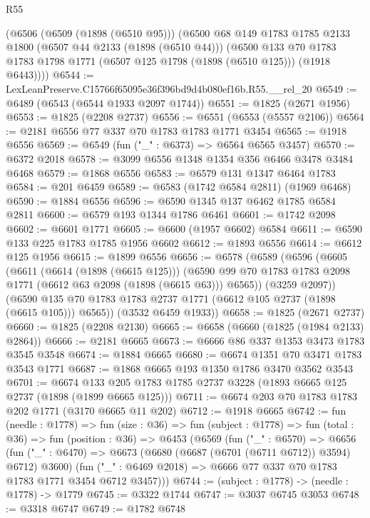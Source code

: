 \begin{lexlean}{R55}
\begin{coremodule}
    (@6506
      (@6509 (@1898 (@6510 @95)))
      (@6500
        @68
        @149
        @1783
        @1785
        @2133
        @1800
        (@6507 @44 @2133 (@1898 (@6510 @44)))
        (@6500
          @133
          @70
          @1783
          @1783
          @1798
          @1771
          (@6507 @125 @1798 (@1898 (@6510 @125)))
          (@1918 @6443))))
@6544 := LexLeanPreserve.C15766f65095e36f396bd9d4b080ef16b.R55.__rel_20
@6549 := @6489 (@6543 (@6544 @1933 @2097 @1744))
@6551 := @1825 (@2671 @1956)
@6553 := @1825 (@2208 @2737)
@6556 := @6551 (@6553 (@5557 @2106))
@6564 := @2181 @6556 @77 @337 @70 @1783 @1783 @1771 @3454
@6565 := @1918 @6556
@6569 := @6549 (fun ("_" : @6373) => @6564 @6565 @3457)
@6570 := @6372 @2018
@6578 := @3099 @6556 @1348 @1354 @356 @6466 @3478 @3484 @6468
@6579 := @1868 @6556
@6583 := @6579 @131 @1347 @6464 @1783
@6584 := @201 @6459
@6589 := @6583 (@1742 @6584 @2811) (@1969 @6468)
@6590 := @1884 @6556
@6596 := @6590 @1345 @137 @6462 @1785 @6584 @2811
@6600 := @6579 @193 @1344 @1786 @6461
@6601 := @1742 @2098
@6602 := @6601 @1771
@6605 := @6600 (@1957 @6602) @6584
@6611 := @6590 @133 @225 @1783 @1785 @1956 @6602
@6612 := @1893 @6556
@6614 := @6612 @125 @1956
@6615 := @1899 @6556
@6656 := @6578
    (@6589
      (@6596
        (@6605
          (@6611
            (@6614 (@1898 (@6615 @125)))
            (@6590 @99 @70 @1783 @1783 @2098 @1771 (@6612 @63 @2098 (@1898 (@6615 @63))) @6565))
          (@3259 @2097))
        (@6590 @135 @70 @1783 @1783 @2737 @1771 (@6612 @105 @2737 (@1898 (@6615 @105))) @6565))
      (@3532 @6459 @1933))
@6658 := @1825 (@2671 @2737)
@6660 := @1825 (@2208 @2130)
@6665 := @6658 (@6660 (@1825 (@1984 @2133) @2864))
@6666 := @2181 @6665
@6673 := @6666 @86 @337 @1353 @3473 @1783 @3545 @3548
@6674 := @1884 @6665
@6680 := @6674 @1351 @70 @3471 @1783 @3543 @1771
@6687 := @1868 @6665 @193 @1350 @1786 @3470 @3562 @3543
@6701 := @6674 @133 @205 @1783 @1785 @2737 @3228 (@1893 @6665 @125 @2737 (@1898 (@1899 @6665 @125)))
@6711 := @6674 @203 @70 @1783 @1783 @202 @1771 (@3170 @6665 @11 @202)
@6712 := @1918 @6665
@6742 := fun (needle : @1778) =>
  fun (size : @36) =>
  fun (subject : @1778) =>
  fun (total : @36) =>
  fun (position : @36) =>
  @6453
    (@6569
      (fun ("_" : @6570) =>
      @6656
        (fun ("_" : @6470) => @6673 (@6680 (@6687 (@6701 (@6711 @6712)) @3594) @6712) @3600)
        (fun ("_" : @6469 @2018) => @6666 @77 @337 @70 @1783 @1783 @1771 @3454 @6712 @3457)))
@6744 := (subject : @1778) -> (needle : @1778) -> @1779
@6745 := @3322 @1744
@6747 := @3037 @6745 @3053
@6748 := @3318 @6747
@6749 := @1782 @6748

\end{coremodule}
\end{lexlean}
